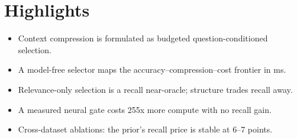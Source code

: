 \documentclass{article}
\begin{document}
\section*{Highlights}
\begin{itemize}
\item Context compression is formulated as budgeted question-conditioned selection. %
\item A model-free selector maps the accuracy--compression--cost frontier in ms. %
\item Relevance-only selection is a recall near-oracle; structure trades recall away. %
\item A measured neural gate costs 255x more compute with no recall gain. %
\item Cross-dataset ablations: the prior's recall price is stable at 6--7 points. %
\end{itemize}
\end{document}
